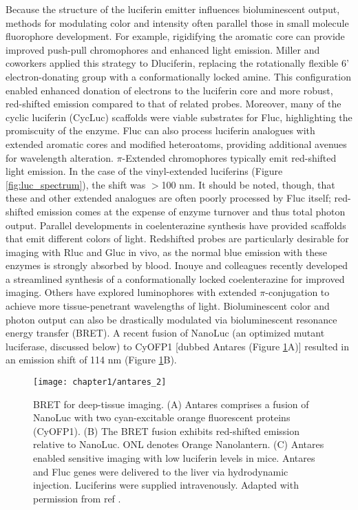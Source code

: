 Because the structure of the luciferin emitter influences
bioluminescent output, methods for modulating color and
intensity often parallel those in small molecule fluorophore
development. For example, rigidifying the aromatic core can
provide improved push-pull chromophores and enhanced
light emission. Miller and coworkers applied this strategy to Dluciferin,
replacing the rotationally flexible 6' electron-donating
group with a conformationally locked amine.\cite{Reddy:2010gaa} This configuration
enabled enhanced donation of electrons to the luciferin
core and more robust, red-shifted emission compared to that of
related probes.\cite{Chu:2016im} Moreover, many of the cyclic luciferin (CycLuc)
scaffolds were viable substrates for Fluc, highlighting the
promiscuity of the enzyme.
Fluc can also process luciferin analogues with extended
aromatic cores and modified heteroatoms, providing additional
avenues for wavelength alteration.\cite{McCutcheon:2012ixb,Woodroofe:2012vx,RN100} $\pi$-Extended chromophores
typically emit red-shifted light emission.\cite{Kuchimaru:2016eba} In the case of
the vinyl-extended luciferins (Figure \ref{fig:luc_spectrum}), the shift was $>$100 nm.
It should be noted, though, that these and other extended
analogues are often poorly processed by Fluc itself; red-shifted
emission comes at the expense of enzyme turnover and thus
total photon output.
Parallel developments in coelenterazine synthesis have
provided scaffolds that emit different colors of light. Redshifted
probes are particularly desirable for imaging with Rluc
and Gluc in vivo, as the normal blue emission with these
enzymes is strongly absorbed by blood.\cite{Zhao:2005if} Inouye and colleagues
recently developed a streamlined synthesis of a conformationally
locked coelenterazine for improved imaging.\cite{Hosoya:2015iu} Others have
explored luminophores with extended $\pi$-conjugation to achieve
more tissue-penetrant wavelengths of light.\cite{Nishihara:2014cr,Grinstead:2016gh}
Bioluminescent color and photon output can also be
drastically modulated via bioluminescent resonance energy
transfer (BRET). A recent fusion of NanoLuc (an optimized
mutant luciferase, discussed below) to CyOFP1 [dubbed
Antares (Figure \ref{fig:antares}A)] resulted in an emission shift of 114 nm
(Figure \ref{fig:antares}B).\cite{Chu:2016im} 

\begin{figure}[htbp]
\texttt{[image: chapter1/antares\_2]}
\centering
\caption[BRET for deep-tissue imaging]{BRET for deep-tissue imaging. (A) Antares comprises a
fusion of NanoLuc with two cyan-excitable orange fluorescent proteins
(CyOFP1). (B) The BRET fusion exhibits red-shifted emission
relative to NanoLuc. ONL denotes Orange Nanolantern. (C) Antares enabled
sensitive imaging with low luciferin levels in mice. Antares and
Fluc genes were delivered to the liver via hydrodynamic injection.
Luciferins were supplied intravenously. Adapted with permission from
ref \cite{Chu:2016im}.}
  \label{fig:antares}
\end{figure}


